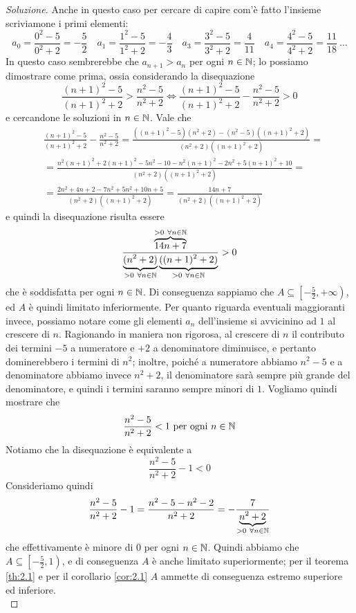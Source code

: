 \begin{proof}[Soluzione]
    Anche in questo caso per cercare di capire com'è fatto l'insieme scriviamone i primi elementi:
    \[
    a_0 = \frac{0^2-5}{0^2+2} = -\frac{5}{2} \quad a_1 = \frac{1^2-5}{1^2+2} = -\frac{4}{3} \quad a_3 = \frac{3^2-5}{3^2+2} = \frac{4}{11} \quad a_4 = \frac{4^2-5}{4^2+2} = \frac{11}{18} \ \dots
    \]
    In questo caso sembrerebbe che $a_{n+1}>a_n$ per ogni $n\in\amsbb{N}$; lo possiamo dimostrare come prima, ossia considerando la disequazione
    \[
    \frac{(n+1)^2-5}{(n+1)^2+2}>\frac{n^2-5}{n^2+2} \iff \frac{(n+1)^2-5}{(n+1)^2+2}-\frac{n^2-5}{n^2+2}>0
    \]
    e cercandone le soluzioni in $n\in\amsbb{N}$. Vale che
    \[
    \begin{split}
        &\frac{(n+1)^2-5}{(n+1)^2+2}-\frac{n^2-5}{n^2+2} = \frac{((n+1)^2-5)(n^2+2)-(n^2-5)((n+1)^2+2)}{(n^2+2)((n+1)^2+2)} = \\
        & = \frac{n^2(n+1)^2+2(n+1)^2-5n^2-10-n^2(n+1)^2-2n^2+5(n+1)^2+10}{(n^2+2)((n+1)^2+2)} = \\
        & = \frac{2n^2+4n+2-7n^2+5n^2+10n+5}{(n^2+2)((n+1)^2+2)} = \frac{14n+7}{(n^2+2)((n+1)^2+2)}
    \end{split}
    \]
    e quindi la disequazione risulta essere
    \[
    \frac{\overbrace{14n+7}^{>0 \ \forall n\in\amsbb{N}}}{\underbrace{(n^2+2)}_{>0 \ \forall n\in\amsbb{N}}\underbrace{((n+1)^2+2)}_{>0 \ \forall n\in \amsbb{N}}}>0
    \]
    che è soddisfatta per ogni $n\in\amsbb{N}$. Di conseguenza sappiamo che $A \subseteq \left[-\frac{5}{2}, +\infty\right)$, ed $A$ è quindi limitato inferiormente. Per quanto riguarda eventuali maggioranti invece, possiamo notare come gli elementi $a_n$ dell'insieme si avvicinino ad $1$ al crescere di $n$. Ragionando in maniera non rigorosa, al crescere di $n$ il contributo dei termini $-5$ a numeratore e $+2$ a denominatore diminuisce, e pertanto dominerebbero i termini di $n^2$; inoltre, poiché a numeratore abbiamo $n^2-5$ e a denominatore abbiamo invece $n^2+2$, il denominatore sarà sempre più grande del denominatore, e quindi i termini saranno sempre minori di $1$. Vogliamo quindi mostrare che
    \[
    \frac{n^2-5}{n^2+2}<1 \ \text{per ogni} \ n\in\amsbb{N}
    \]
    Notiamo che la disequazione è equivalente a
    \[
    \frac{n^2-5}{n^2+2}-1 <0 
    \]
    Consideriamo quindi
    \[
    \frac{n^2-5}{n^2+2}-1 = \frac{n^2-5-n^2-2}{n^2+2} = -\frac{7}{\underbrace{n^2+2}_{>0 \ \forall n\in\amsbb{N}}}
    \]
    che effettivamente è minore di 0 per ogni $n\in\amsbb{N}$. Quindi abbiamo che $A\subseteq\left[-\frac{5}{2}, 1\right)$, e di conseguenza $A$ è anche limitato superiormente; per il teorema \ref{th:2.1} e per il corollario \ref{cor:2.1} $A$ ammette di conseguenza estremo superiore ed inferiore.\\

\end{proof}
